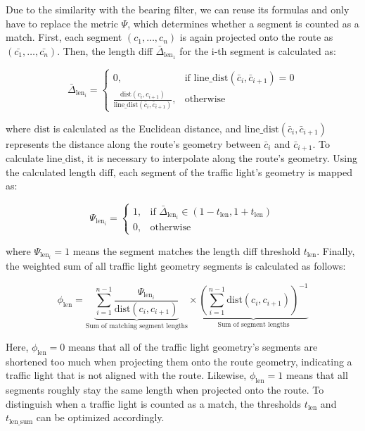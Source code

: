 Due to the similarity with the bearing filter, we can reuse its formulas and only have to replace the metric $\Psi$, which determines whether a segment is counted as a match. First, each segment $(c_1, \dots, c_n)$ is again projected onto the route as $(\bar{c_1}, \dots, \bar{c_n})$. Then, the length diff $\bar{\Delta}_{\text{len}_1}$ for the i-th segment is calculated as:

\begin{equation}
    \bar{\Delta}_{\text{len}_i} = 
        \begin{cases}
            0,& \text{if } \text{line\_dist}(\bar{c}_i, \bar{c}_{i+1}) = 0 \\
            \frac{\text{dist}(c_{i}, c_{i+1})}{\text{line\_dist}(\bar{c}_{i}, \bar{c}_{i+1})},              & \text{otherwise}
        \end{cases}
\end{equation}

where $\text{dist}$ is calculated as the Euclidean distance, and $\text{line\_dist}(\bar{c}_i, \bar{c}_{i+1})$ represents the distance along the route's geometry between $\bar{c}_i$ and $\bar{c}_{i+1}$. To calculate $\text{line\_dist}$, it is necessary to interpolate along the route's geometry. Using the calculated length diff, each segment of the traffic light's geometry is mapped as:

\begin{equation}
\Psi_{\text{len}_i} = 
    \begin{cases}
            1,& \text{if } \bar{\Delta}_{\text{len}_{i}} \in \left(1 - t_{\text{len}}, 1 + t_{\text{len}}\right)\\
            0,              & \text{otherwise}
        \end{cases}
\end{equation}

where $\Psi_{\text{len}_i} = 1$ means the segment matches the length diff threshold $t_{\text{len}}$. Finally, the weighted sum of all traffic light geometry segments is calculated as follows:

\begin{equation} 
\phi_{\text{len}} = 
    \underbrace{\sum_{i=1}^{n-1} 
    \frac{\Psi_{\text{len}_i}}{\text{dist}(c_i, c_{i+1})}}_{\text{Sum of matching segment lengths}}
    \times
    \underbrace{(\sum_{i=1}^{n-1} \text{dist}(c_i, c_{i+1}))^{-1}}_{\text{Sum of segment lengths}}
\end{equation}

Here, $\phi_{\text{len}} = 0$ means that all of the traffic light geometry's segments are shortened too much when projecting them onto the route geometry, indicating a traffic light that is not aligned with the route. Likewise, $\phi_{\text{len}} = 1$ means that all segments roughly stay the same length when projected onto the route. To distinguish when a traffic light is counted as a match, the thresholds $t_{\text{len}}$ and $t_{\text{len\_sum}}$ can be optimized accordingly.

